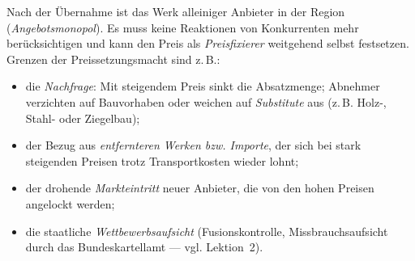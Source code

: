 \begin{loesung}[title={Lösung Aufgabe~1.8 --- Preisbildung im Oligopol und im Monopol}]
Nach der Übernahme ist das Werk alleiniger Anbieter in der Region
(\emph{Angebotsmonopol}). Es muss keine Reaktionen von Konkurrenten mehr berücksichtigen
und kann den Preis als \emph{Preisfixierer} weitgehend selbst festsetzen. Grenzen der
Preissetzungsmacht sind z.\,B.:
\begin{itemize}
  \item die \emph{Nachfrage}: Mit steigendem Preis sinkt die Absatzmenge; Abnehmer
    verzichten auf Bauvorhaben oder weichen auf \emph{Substitute} aus (z.\,B. Holz-,
    Stahl- oder Ziegelbau);
  \item der Bezug aus \emph{entfernteren Werken bzw. Importe}, der sich bei stark
    steigenden Preisen trotz Transportkosten wieder lohnt;
  \item der drohende \emph{Markteintritt} neuer Anbieter, die von den hohen Preisen
    angelockt werden;
  \item die staatliche \emph{Wettbewerbsaufsicht} (Fusionskontrolle,
    Missbrauchsaufsicht durch das Bundeskartellamt --- vgl. Lektion~2).
\end{itemize}
\end{loesung}
